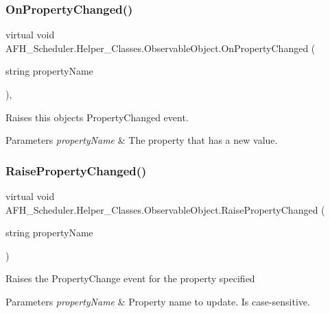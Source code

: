 \subsubsection{OnPropertyChanged()}
{\footnotesize\ttfamily virtual void A\+F\+H\+\_\+\+Scheduler.\+Helper\+\_\+\+Classes.\+Observable\+Object.\+On\+Property\+Changed (\begin{DoxyParamCaption}\item[{string}]{property\+Name }\end{DoxyParamCaption})\hspace{0.3cm}{\ttfamily [protected]}, {\ttfamily [virtual]}}



Raises this object\textquotesingle{}s Property\+Changed event. 


\begin{DoxyParams}{Parameters}
{\em property\+Name} & The property that has a new value.\\
\hline
\end{DoxyParams}
\mbox{\label{class_a_f_h___scheduler_1_1_helper___classes_1_1_observable_object_a1aeecfa9800035629db7ca8d08322dc5}} 
\subsubsection{RaisePropertyChanged()}
{\footnotesize\ttfamily virtual void A\+F\+H\+\_\+\+Scheduler.\+Helper\+\_\+\+Classes.\+Observable\+Object.\+Raise\+Property\+Changed (\begin{DoxyParamCaption}\item[{string}]{property\+Name }\end{DoxyParamCaption})\hspace{0.3cm}{\ttfamily [virtual]}}



Raises the Property\+Change event for the property specified 


\begin{DoxyParams}{Parameters}
{\em property\+Name} & Property name to update. Is case-\/sensitive.\\
\hline
\end{DoxyParams}
\mbox{\label{class_a_f_h___scheduler_1_1_helper___classes_1_1_observable_object_ab8361d16e697573b81c84829a8d448cc}} 
